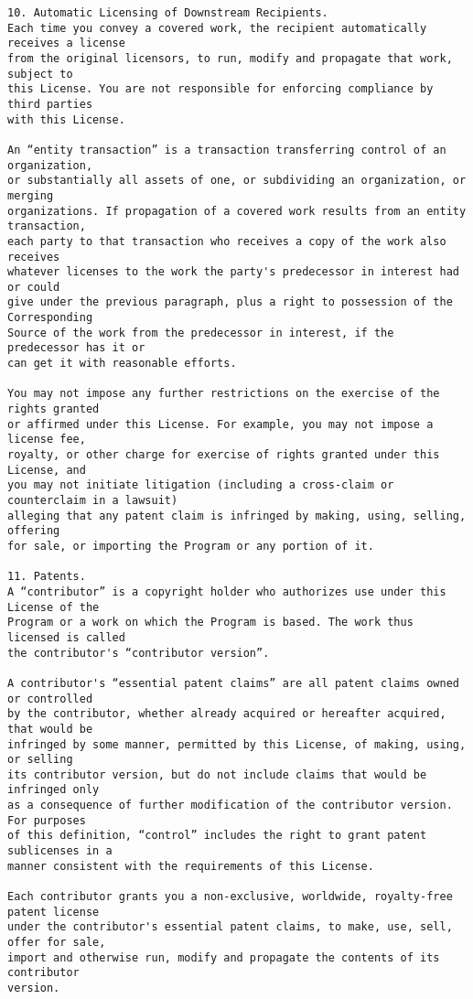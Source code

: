 \begin{verbatim}
10. Automatic Licensing of Downstream Recipients.
Each time you convey a covered work, the recipient automatically receives a license
from the original licensors, to run, modify and propagate that work, subject to
this License. You are not responsible for enforcing compliance by third parties
with this License.

An “entity transaction” is a transaction transferring control of an organization,
or substantially all assets of one, or subdividing an organization, or merging
organizations. If propagation of a covered work results from an entity transaction,
each party to that transaction who receives a copy of the work also receives
whatever licenses to the work the party's predecessor in interest had or could
give under the previous paragraph, plus a right to possession of the Corresponding
Source of the work from the predecessor in interest, if the predecessor has it or
can get it with reasonable efforts.

You may not impose any further restrictions on the exercise of the rights granted
or affirmed under this License. For example, you may not impose a license fee,
royalty, or other charge for exercise of rights granted under this License, and
you may not initiate litigation (including a cross-claim or counterclaim in a lawsuit)
alleging that any patent claim is infringed by making, using, selling, offering
for sale, or importing the Program or any portion of it.

11. Patents.
A “contributor” is a copyright holder who authorizes use under this License of the
Program or a work on which the Program is based. The work thus licensed is called
the contributor's “contributor version”.

A contributor's “essential patent claims” are all patent claims owned or controlled
by the contributor, whether already acquired or hereafter acquired, that would be
infringed by some manner, permitted by this License, of making, using, or selling
its contributor version, but do not include claims that would be infringed only
as a consequence of further modification of the contributor version. For purposes
of this definition, “control” includes the right to grant patent sublicenses in a
manner consistent with the requirements of this License.

Each contributor grants you a non-exclusive, worldwide, royalty-free patent license
under the contributor's essential patent claims, to make, use, sell, offer for sale,
import and otherwise run, modify and propagate the contents of its contributor
version.


\end{verbatim}
